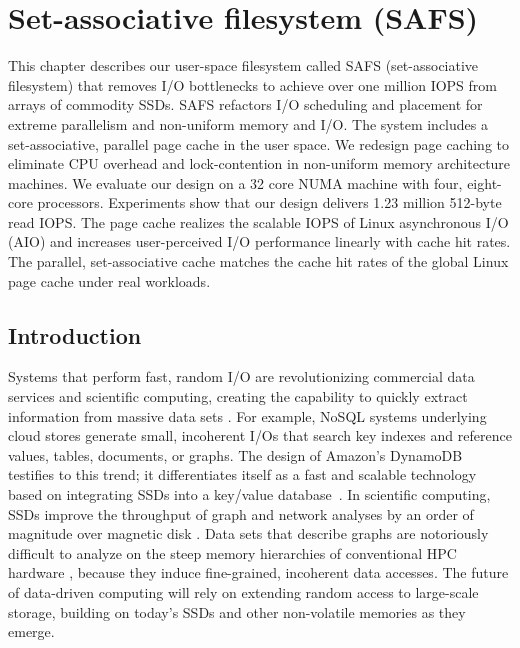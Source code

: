 \chapter{Set-associative filesystem (SAFS)}
\label{sec:safs}

This chapter describes our user-space filesystem called SAFS
(set-associative filesystem) that removes I/O bottlenecks to achieve over one
million IOPS from arrays of commodity SSDs. SAFS refactors I/O scheduling and
placement for extreme parallelism and non-uniform memory and I/O.
The system includes a set-associative, parallel page cache in the user space.
We redesign page caching to eliminate CPU overhead and lock-contention in
non-uniform memory architecture machines.
We evaluate our design on a 32 core NUMA machine with four, eight-core processors. 
Experiments show that our design delivers 1.23 million 512-byte read IOPS.
The page cache realizes the scalable IOPS of Linux asynchronous I/O (AIO) 
and increases
user-perceived I/O performance linearly with cache hit rates.
The parallel, set-associative cache matches the cache hit rates
of the global Linux page cache under real workloads.

\section{Introduction}

Systems that perform fast, random I/O are revolutionizing commercial data
services and scientific computing, creating the capability to quickly 
extract information from massive data sets \cite{4thparadigm}.  
For example, NoSQL systems underlying cloud stores generate
small, incoherent I/Os that search key indexes and reference values, tables, documents,
or graphs.  The design of Amazon's DynamoDB testifies to this trend; it differentiates
itself as a fast and scalable technology based on integrating SSDs
into a key/value database~\cite{dynamodb}.  In scientific computing, SSDs improve the throughput 
of graph and network analyses by an order of magnitude over magnetic disk \cite{Pearce10}.
Data sets that describe graphs are notoriously difficult
to analyze on the steep memory hierarchies of conventional HPC hardware 
\cite{Hendrickson09}, because they induce fine-grained, incoherent data accesses.
The future of data-driven computing will rely on extending random access to large-scale 
storage, building on today's SSDs and other non-volatile memories as they emerge.

